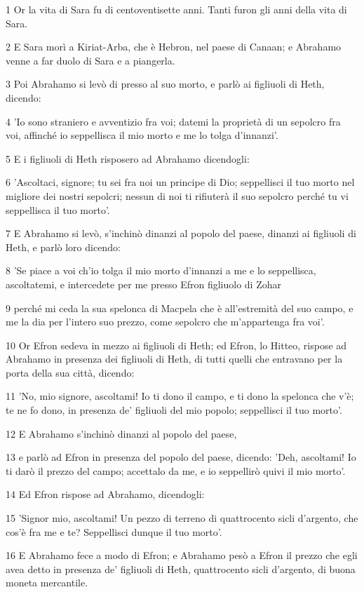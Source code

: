 \par 1 Or la vita di Sara fu di centoventisette anni. Tanti furon gli anni della vita di Sara.
\par 2 E Sara morì a Kiriat-Arba, che è Hebron, nel paese di Canaan; e Abrahamo venne a far duolo di Sara e a piangerla.
\par 3 Poi Abrahamo si levò di presso al suo morto, e parlò ai figliuoli di Heth, dicendo:
\par 4 'Io sono straniero e avventizio fra voi; datemi la proprietà di un sepolcro fra voi, affinché io seppellisca il mio morto e me lo tolga d'innanzi'.
\par 5 E i figliuoli di Heth risposero ad Abrahamo dicendogli:
\par 6 'Ascoltaci, signore; tu sei fra noi un principe di Dio; seppellisci il tuo morto nel migliore dei nostri sepolcri; nessun di noi ti rifiuterà il suo sepolcro perché tu vi seppellisca il tuo morto'.
\par 7 E Abrahamo si levò, s'inchinò dinanzi al popolo del paese, dinanzi ai figliuoli di Heth, e parlò loro dicendo:
\par 8 'Se piace a voi ch'io tolga il mio morto d'innanzi a me e lo seppellisca, ascoltatemi, e intercedete per me presso Efron figliuolo di Zohar
\par 9 perché mi ceda la sua spelonca di Macpela che è all'estremità del suo campo, e me la dia per l'intero suo prezzo, come sepolcro che m'appartenga fra voi'.
\par 10 Or Efron sedeva in mezzo ai figliuoli di Heth; ed Efron, lo Hitteo, rispose ad Abrahamo in presenza dei figliuoli di Heth, di tutti quelli che entravano per la porta della sua città, dicendo:
\par 11 'No, mio signore, ascoltami! Io ti dono il campo, e ti dono la spelonca che v'è; te ne fo dono, in presenza de' figliuoli del mio popolo; seppellisci il tuo morto'.
\par 12 E Abrahamo s'inchinò dinanzi al popolo del paese,
\par 13 e parlò ad Efron in presenza del popolo del paese, dicendo: 'Deh, ascoltami! Io ti darò il prezzo del campo; accettalo da me, e io seppellirò quivi il mio morto'.
\par 14 Ed Efron rispose ad Abrahamo, dicendogli:
\par 15 'Signor mio, ascoltami! Un pezzo di terreno di quattrocento sicli d'argento, che cos'è fra me e te? Seppellisci dunque il tuo morto'.
\par 16 E Abrahamo fece a modo di Efron; e Abrahamo pesò a Efron il prezzo che egli avea detto in presenza de' figliuoli di Heth, quattrocento sicli d'argento, di buona moneta mercantile.
